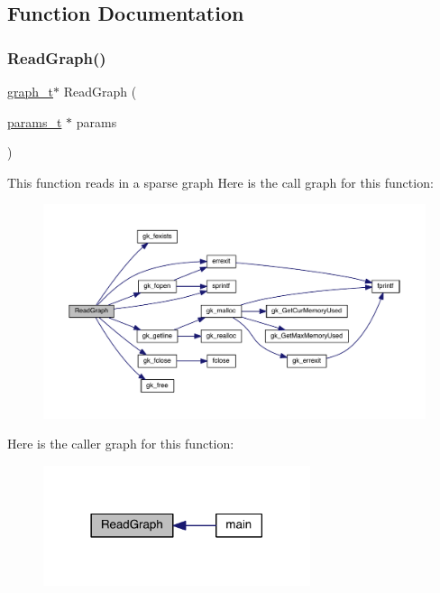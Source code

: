 \subsection{Function Documentation}
\mbox{\label{a00858_a9add4a9694da47d84beb4a7638a7b673}} 
\subsubsection{\texorpdfstring{Read\+Graph()}{ReadGraph()}}
{\footnotesize\ttfamily \hyperlink{a00734}{graph\+\_\+t}$\ast$ Read\+Graph (\begin{DoxyParamCaption}\item[{\hyperlink{a00706}{params\+\_\+t} $\ast$}]{params }\end{DoxyParamCaption})}

This function reads in a sparse graph Here is the call graph for this function\+:\nopagebreak
\begin{figure}[H]
\begin{center}
\leavevmode
\includegraphics[width=350pt]{a00858_a9add4a9694da47d84beb4a7638a7b673_cgraph}
\end{center}
\end{figure}
Here is the caller graph for this function\+:\nopagebreak
\begin{figure}[H]
\begin{center}
\leavevmode
\includegraphics[width=222pt]{a00858_a9add4a9694da47d84beb4a7638a7b673_icgraph}
\end{center}
\end{figure}
\mbox{\label{a00858_a1ce1ff57b84c6de0f3beb24b48bf9af9}} 
